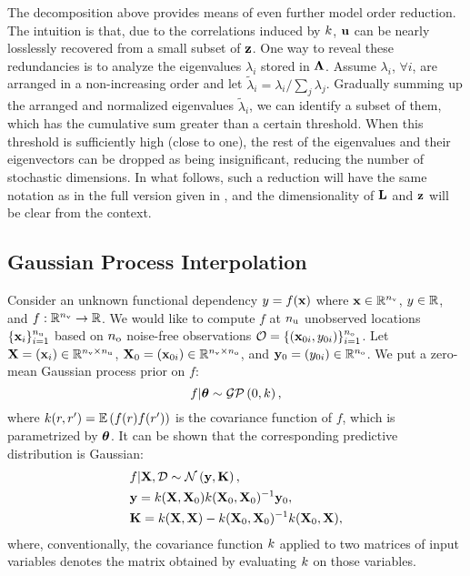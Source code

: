 The decomposition above provides means of even further model order reduction. The intuition is that, due to the correlations induced by $\fCov$, $\mathbf{u}$ can be nearly losslessly recovered from a small subset of $\mathbf{z}$. One way to reveal these redundancies is to analyze the eigenvalues $\lambda_i$ stored in $\mathbf{\Lambda}$. Assume $\lambda_i$, $\forall i$, are arranged in a non-increasing order and let $\tilde{\lambda}_i = \lambda_i / \sum_j \lambda_j$. Gradually summing up the arranged and normalized eigenvalues $\tilde{\lambda}_i$, we can identify a subset of them, which has the cumulative sum greater than a certain threshold. When this threshold is sufficiently high (close to one), the rest of the eigenvalues and their eigenvectors can be dropped as being insignificant, reducing the number of stochastic dimensions. In what follows, such a reduction will have the same notation as in the full version given in , and the dimensionality of $\mathbf{L}$ and $\mathbf{z}$ will be clear from the context.

\subsection{Gaussian Process Interpolation} 
Consider an unknown functional dependency $y = f(\mathbf{x})$ where $\mathbf{x} \in \mathbb{R}^{n_\text{v}}$, $y \in \mathbb{R}$, and $f: \mathbb{R}^{n_\text{v}} \to \mathbb{R}$. We would like to compute $f$ at ${n_\text{u}}$ unobserved locations $\{ \mathbf{x}_i \}_{i = 1}^{n_\text{u}}$ based on ${n_\text{o}}$ noise-free observations $\mathcal{O} = \{ (\mathbf{x}_{0i}, y_{0i}) \}_{i = 1}^{n_\text{o}}$. Let $\mathbf{X} = (\mathbf{x}_i) \in \mathbb{R}^{{n_\text{v}} \times {n_\text{u}}}$, $\mathbf{X}_0 = (\mathbf{x}_{0i}) \in \mathbb{R}^{{n_\text{v}} \times {n_\text{o}}}$, and $\mathbf{y}_0 = (y_{0i}) \in \mathbb{R}^{n_\text{o}}$. We put a zero-mean Gaussian process prior on $f$:
\[
  f | \vparam \sim \gaussianp{0}{\fCov},
\]
where $\fCov{\r, \r'} = \E{f(\r) f(\r')}$ is the covariance function of $f$, which is parametrized by ${\boldsymbol\theta}$. It can be shown \cite{mackay2003, rasmussen2006} that the corresponding predictive distribution is Gaussian:
\begin{align*}
  & f | \m{X}, \Data \sim \gaussian{\v{y}}{\mCov}, \\
  & \v{y} = \fCov{\m{X}, \m{X}_0} \fCov{\m{X}_0, \m{X}_0}^{-1} \v{y}_0, \\
  & \mCov = \fCov{\m{X}, \m{X}} - \fCov{\m{X}_0, \m{X}_0}^{-1} \fCov{\m{X}_0, \m{X}},
\end{align*}
where, conventionally, the covariance function $\fCov$ applied to two matrices of input variables denotes the matrix obtained by evaluating $\fCov$ on those variables.
